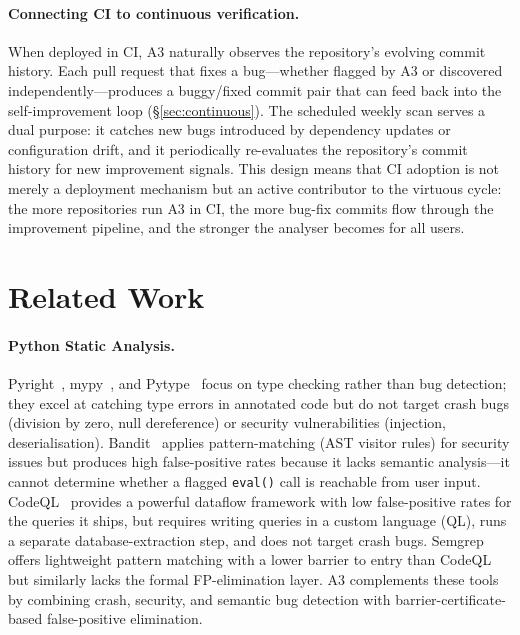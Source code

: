 \documentclass[sigconf,review,anonymous]{acmart}
\begin{document}
\paragraph{Connecting CI to continuous verification.}
When deployed in CI, \textsc{A3} naturally observes the repository's evolving commit history.
Each pull request that fixes a bug---whether flagged by \textsc{A3} or discovered independently---produces a buggy/fixed commit pair that can feed back into the self-improvement loop (\S\ref{sec:continuous}).
The scheduled weekly scan serves a dual purpose: it catches new bugs introduced by dependency updates or configuration drift, and it periodically re-evaluates the repository's commit history for new improvement signals.
This design means that CI adoption is not merely a deployment mechanism but an active contributor to the virtuous cycle: the more repositories run \textsc{A3} in CI, the more bug-fix commits flow through the improvement pipeline, and the stronger the analyser becomes for all users.

\section{Related Work}\label{sec:related}

\paragraph{Python Static Analysis.}
Pyright~\cite{pyright}, mypy~\cite{mypy}, and Pytype~\cite{pytype} focus on type checking rather than bug detection; they excel at catching type errors in annotated code but do not target crash bugs (division by zero, null dereference) or security vulnerabilities (injection, deserialisation).
Bandit~\cite{bandit} applies pattern-matching (AST visitor rules) for security issues but produces high false-positive rates because it lacks semantic analysis---it cannot determine whether a flagged \texttt{eval()} call is reachable from user input.
CodeQL~\cite{codeql} provides a powerful dataflow framework with low false-positive rates for the queries it ships, but requires writing queries in a custom language (QL), runs a separate database-extraction step, and does not target crash bugs.
Semgrep~\cite{semgrep} offers lightweight pattern matching with a lower barrier to entry than CodeQL but similarly lacks the formal FP-elimination layer.
\textsc{A3} complements these tools by combining crash, security, and semantic bug detection with barrier-certificate-based false-positive elimination.
\end{document}
